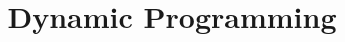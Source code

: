 \documentclass{beamer}
\title{Dynamic Programming}
\begin{document}
\frame{
  \titlepage
}
\end{document}
